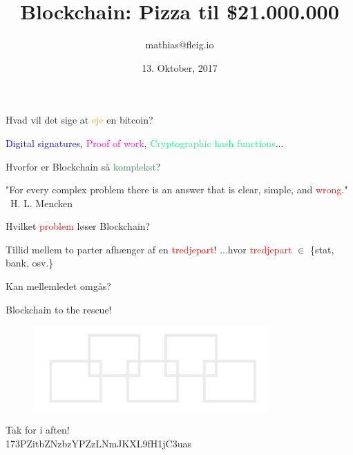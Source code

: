 \documentclass[usenames, dvipsnames]{beamer}
\title{Blockchain: Pizza til \$21.000.000}
\date{13. Oktober, 2017}
\author{mathias@fleig.io}
\institute{Datalogisk Institut \\ Københavns Universitet}
\begin{document}
  \maketitle
  \begin{frame}{}
    \center Hvad vil det sige at \textcolor{Goldenrod}{eje} en bitcoin?
  \end{frame}
  \begin{frame}{}
    \center \textcolor{blue}{Digital signatures}, \textcolor{Magenta}{Proof of work}, \center \textcolor{SpringGreen}{Cryptographic hash functions}...
  \end{frame}
  \begin{frame}{}
    \center Hvorfor er Blockchain så \textcolor{SeaGreen}{komplekst}?
  \end{frame}
  \begin{frame}{}
      \center "For every complex problem there is an answer that is clear,
			   simple, and \textcolor{red}{wrong}." \textemdash \ H. L. Mencken
  \end{frame}
  \begin{frame}{}
    \center Hvilket \textcolor{red}{problem} løser Blockchain?
  \end{frame}
  \begin{frame}{}
    \center Tillid mellem to parter afhænger af en \textcolor{red}{tredjepart}!
	\center ...hvor \textcolor{red}{tredjepart} $\in$ \{stat, bank, osv.\}
  \end{frame}
  \begin{frame}{}
	\center Kan mellemledet omgås?
  \end{frame}
  \begin{frame}{}
	\center Blockchain to the rescue!
  \end{frame}
  \begin{frame}{}
    \begin{figure}[ht!]
    \centering
    \includegraphics[width=90mm]{blockchain.png}
    \end{figure}
  \end{frame}
  \begin{frame}{}
    \center \LARGE Tak for i aften! \\
    \small \center 173PZitbZNzbzYPZzLNmJKXL9fH1jC3uas
  \end{frame}
\end{document}

